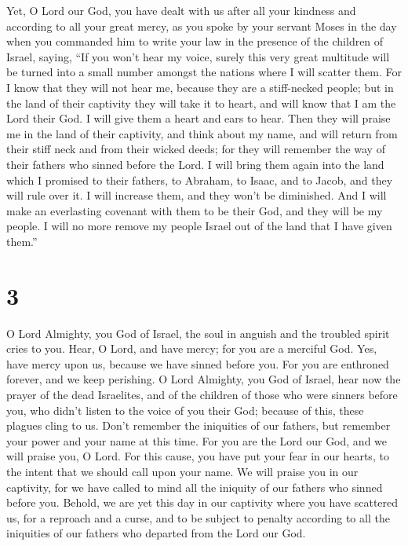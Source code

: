  Yet, O Lord our God, you have dealt with us after all your
kindness and according to all your great mercy,  as you
spoke by your servant Moses in the day when you commanded him to write
your law in the presence of the children of Israel, saying,
 ``If you won't hear my voice, surely this very great
multitude will be turned into a small number amongst the nations where I
will scatter them.  For I know that they will not hear me,
because they are a stiff-necked people; but in the land of their
captivity they will take it to heart,  and will know that I
am the Lord their God. I will give them a heart and ears to hear.
 Then they will praise me in the land of their captivity,
and think about my name,  and will return from their stiff
neck and from their wicked deeds; for they will remember the way of
their fathers who sinned before the Lord.  I will bring
them again into the land which I promised to their fathers, to Abraham,
to Isaac, and to Jacob, and they will rule over it. I will increase
them, and they won't be diminished.  And I will make an
everlasting covenant with them to be their God, and they will be my
people. I will no more remove my people Israel out of the land that I
have given them.''

\hypertarget{section-2}{%
\section{3}\label{section-2}}

 O Lord Almighty, you God of Israel, the soul in anguish and
the troubled spirit cries to you.  Hear, O Lord, and have
mercy; for you are a merciful God. Yes, have mercy upon us, because we
have sinned before you.  For you are enthroned forever, and
we keep perishing.  O Lord Almighty, you God of Israel, hear
now the prayer of the dead Israelites, and of the children of those who
were sinners before you, who didn't listen to the voice of you their
God; because of this, these plagues cling to us.  Don't
remember the iniquities of our fathers, but remember your power and your
name at this time.  For you are the Lord our God, and we
will praise you, O Lord.  For this cause, you have put your
fear in our hearts, to the intent that we should call upon your name. We
will praise you in our captivity, for we have called to mind all the
iniquity of our fathers who sinned before you.  Behold, we
are yet this day in our captivity where you have scattered us, for a
reproach and a curse, and to be subject to penalty according to all the
iniquities of our fathers who departed from the Lord our God.

